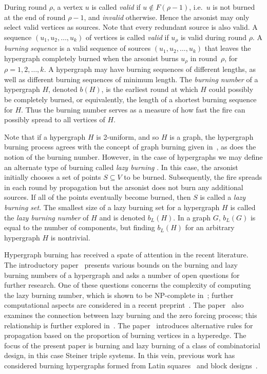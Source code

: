 \documentclass[12pt]{article}
\theoremstyle{definition}
\numberwithin{table}{section}
\newcommand{\round}{{\rho}}
\begin{document}
During round $\round$, a vertex $u$ is called {\em valid} if $u \notin F(\round-1)$, i.e.\ $u$ is not burned at the end of round $\round-1$, and {\em invalid} otherwise.
Hence the arsonist may only select valid vertices as sources.
Note that every redundant source is also valid. A sequence $(u_1,u_2,\ldots,u_k)$ of vertices is called {\em valid} if $u_\round$ is valid during round $\round$.  A {\em burning sequence} is a valid sequence of sources $(u_1,u_2,\ldots,u_k)$ that leaves the hypergraph completely burned when the arsonist burns $u_\round$ in round~$\round$, for $\round=1,2,\ldots,k$. 
A hypergraph may have  burning sequences of different lengths, as well as different burning sequences of minimum length.
The \textit{burning number} of a hypergraph $H$, denoted $b(H)$, is the earliest round at which $H$ could possibly be completely burned, or equivalently, the length of a shortest burning sequence for $H$. Thus the burning number serves as a measure of how fast the fire can possibly spread to all vertices of $H$.

Note that if a hypergraph $H$ is 2-uniform, and so $H$ is a graph, the hypergraph burning process agrees with the concept of graph burning given in~\cite{BJR_WAW,BJR_InternetMath}, as does the notion of the burning number.
However, in the case of hypergraphs we may define an alternate type of burning called {\em lazy burning} \cite{introducing_hyp_burn,mythesis}. In this case, the arsonist initially chooses a set of points $S\subseteq V$ to be burned.  Subsequently, the fire spreads in each round by propagation but the arsonist does not burn any additional sources. If all of the points eventually become burned, then $S$ is called a {\em lazy burning set}. The smallest size of a lazy burning set for a hypergraph $H$ is called the {\em lazy burning number} of $H$ and is denoted $b_L(H)$. In a graph $G$, $b_L(G)$ is equal to the number of components, but finding $b_L(H)$ for an arbitrary hypergraph $H$ is nontrivial.


Hypergraph burning has received a spate of attention in the recent literature.  The introductory paper~\cite{introducing_hyp_burn} presents various bounds on the burning and lazy burning numbers of a hypergraph and asks a number of open questions for further research.  One of these questions concerns the complexity of computing the lazy burning number, which is shown to be NP-complete in~\cite{BurningMatchingZeroForcing}; further computational aspects are considered in a recent preprint~\cite{AhadiBiniaz}.  The paper~\cite{BurningMatchingZeroForcing} also examines the connection between lazy burning and the zero forcing process; this relationship is further explored in~\cite{AbiadMallee}. 
The paper~\cite{Proportional} introduces alternative rules for propagation based on the proportion of burning vertices in a hyperedge.
The focus of the present paper is burning and lazy burning of a class of combinatorial design, in this case Steiner triple systems.  In this vein, previous work has considered burning hypergraphs formed from Latin squares~\cite{BJMM} and block designs~\cite{AhadiBiniaz}. 
\end{document}
